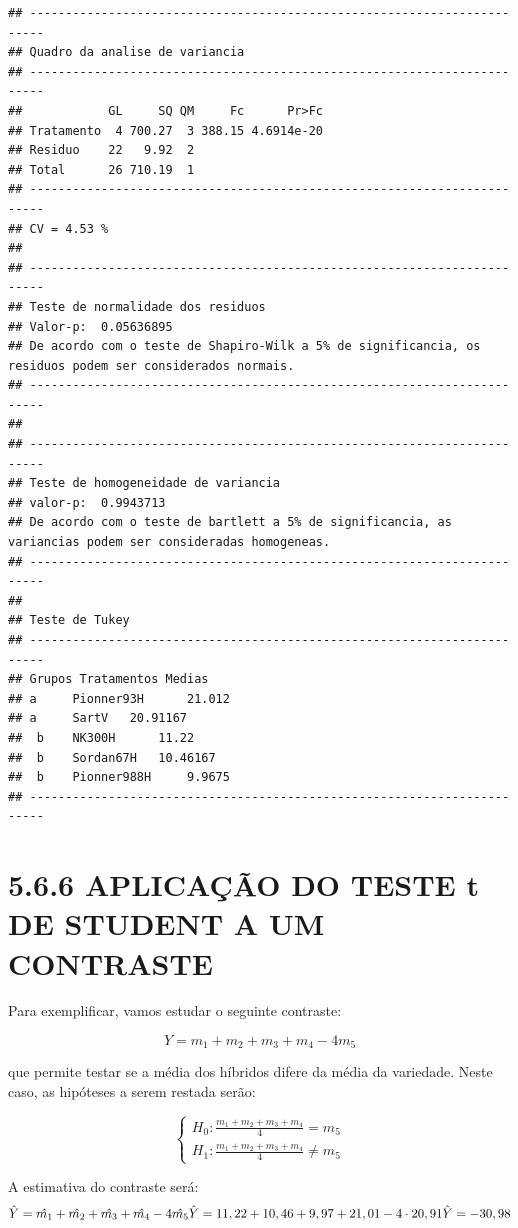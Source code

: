 \documentclass[
]{book}
\begin{document}
\begin{verbatim}
## ------------------------------------------------------------------------
## Quadro da analise de variancia
## ------------------------------------------------------------------------
##            GL     SQ QM     Fc      Pr>Fc
## Tratamento  4 700.27  3 388.15 4.6914e-20
## Residuo    22   9.92  2                  
## Total      26 710.19  1                  
## ------------------------------------------------------------------------
## CV = 4.53 %
## 
## ------------------------------------------------------------------------
## Teste de normalidade dos residuos 
## Valor-p:  0.05636895 
## De acordo com o teste de Shapiro-Wilk a 5% de significancia, os residuos podem ser considerados normais.
## ------------------------------------------------------------------------
## 
## ------------------------------------------------------------------------
## Teste de homogeneidade de variancia 
## valor-p:  0.9943713 
## De acordo com o teste de bartlett a 5% de significancia, as variancias podem ser consideradas homogeneas.
## ------------------------------------------------------------------------
## 
## Teste de Tukey
## ------------------------------------------------------------------------
## Grupos Tratamentos Medias
## a 	 Pionner93H 	 21.012 
## a 	 SartV 	 20.91167 
##  b 	 NK300H 	 11.22 
##  b 	 Sordan67H 	 10.46167 
##  b 	 Pionner988H 	 9.9675 
## ------------------------------------------------------------------------
\end{verbatim}

\hypertarget{aplicauxe7uxe3o-do-teste-t-de-student-a-um-contraste}{%
\section{5.6.6 APLICAÇÃO DO TESTE t DE STUDENT A UM CONTRASTE}\label{aplicauxe7uxe3o-do-teste-t-de-student-a-um-contraste}}

Para exemplificar, vamos estudar o seguinte contraste:

\[
Y=m_1+m_2+m_3+m_4-4m_5
\]

que permite testar se a média dos híbridos difere da média da variedade. Neste caso, as hipóteses a serem restada serão:

\[
\begin{cases}  H_0:\frac{m_1+m_2+m_3+m_4}{4}=m_5 \\
H_1: \frac{m_1+m_2+m_3+m_4}{4} \neq m_5 \end{cases}
\]

A estimativa do contraste será:
\[
\hat{Y} = \hat{m_1}+\hat{m_2}+\hat{m_3}+\hat{m_4}-4\hat{m_5} \\
\hat{Y} = 11,22+10,46+9,97+21,01-4\cdot20,91 \\
\hat{Y} = -30,98
\]
\end{document}

